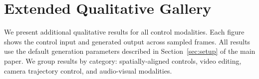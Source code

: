 \section{Extended Qualitative Gallery}
\label{sec:supp_gallery}

We present additional qualitative results for all control modalities. Each figure shows the control input and generated output across sampled frames. All results use the default generation parameters described in Section~\ref{sec:setup} of the main paper. We group results by category: spatially-aligned controls, video editing, camera trajectory control, and audio-visual modalities.


